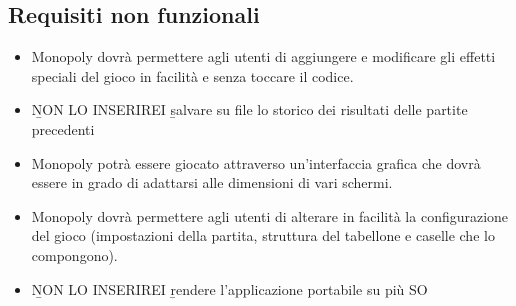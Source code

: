 \subsection*{Requisiti non funzionali}
\begin{itemize}
    \item 
    Monopoly dovrà permettere agli utenti di aggiungere e 
    modificare gli effetti speciali del gioco in facilità e senza toccare il codice.
    \item \b NON LO INSERIREI \b salvare su file lo storico dei risultati delle partite precedenti
    \item Monopoly potrà essere giocato attraverso un'interfaccia grafica
    che dovrà essere in grado di adattarsi alle dimensioni di vari schermi.
    \item 
    Monopoly dovrà permettere agli utenti di alterare in facilità la 
    configurazione del gioco (impostazioni della partita, struttura del tabellone e caselle che lo compongono).
    \item \b NON LO INSERIREI \b rendere l’applicazione portabile su più SO
\end{itemize}


